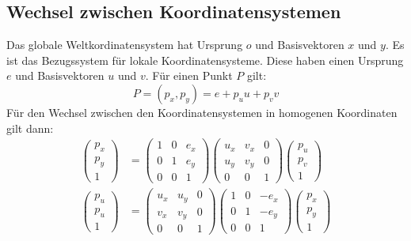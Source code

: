 \subsection{Wechsel zwischen Koordinatensystemen}
Das globale Weltkordinatensystem hat Ursprung $o$ und Basisvektoren $x$ und $y$.
Es ist das Bezugssystem für lokale Koordinatensysteme.
Diese haben einen Ursprung $e$ und Basisvektoren $u$ und $v$.
Für einen Punkt $P$ gilt:
\[
  P = (p_x, p_y) = e + p_uu + p_vv
\]
Für den Wechsel zwischen den Koordinatensystemen in homogenen Koordinaten gilt dann:
\begin{align*}
  \begin{pmatrix}
    p_x \\
    p_y \\
    1
  \end{pmatrix}
  &=
  \begin{pmatrix}
    1 & 0 & e_x \\
    0 & 1 & e_y \\
    0 & 0 & 1
  \end{pmatrix}
  \begin{pmatrix}
    u_x & v_x & 0 \\
    u_y & v_y & 0 \\
    0   & 0   & 1
  \end{pmatrix}
  \begin{pmatrix}
    p_u \\
    p_v \\
    1
  \end{pmatrix} \\
  \begin{pmatrix}
    p_u \\
    p_u \\
    1
  \end{pmatrix}
  &=
  \begin{pmatrix}
    u_x & u_y & 0 \\
    v_x & v_y & 0 \\
    0   & 0   & 1
  \end{pmatrix}
  \begin{pmatrix}
    1 & 0 & -e_x \\
    0 & 1 & -e_y \\
    0 & 0 & 1
  \end{pmatrix}
  \begin{pmatrix}
    p_x \\
    p_y \\
    1
  \end{pmatrix}
\end{align*}

